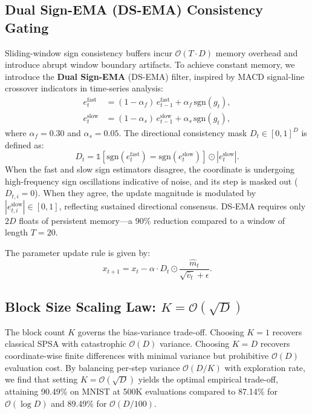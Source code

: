 \documentclass[11pt,a4paper]{article}
\begin{document}
\subsection{Dual Sign-EMA (DS-EMA) Consistency Gating}
\label{sec:ds_ema}

Sliding-window sign consistency buffers incur $\mathcal{O}(T \cdot D)$ memory overhead and introduce abrupt window boundary artifacts. To achieve constant memory, we introduce the \textbf{Dual Sign-EMA} (DS-EMA) filter, inspired by MACD signal-line crossover indicators in time-series analysis:
\begin{align}
    e_t^{\text{fast}} &= (1 - \alpha_f) \, e_{t-1}^{\text{fast}} + \alpha_f \, \text{sgn}(g_t), \label{eq:ema_fast} \\
    e_t^{\text{slow}} &= (1 - \alpha_s) \, e_{t-1}^{\text{slow}} + \alpha_s \, \text{sgn}(g_t), \label{eq:ema_slow}
\end{align}
where $\alpha_f = 0.30$ and $\alpha_s = 0.05$. The directional consistency mask $D_t \in [0, 1]^D$ is defined as:
\begin{equation}
    D_t = \mathbb{1}[\text{sgn}(e_t^{\text{fast}}) = \text{sgn}(e_t^{\text{slow}})] \odot |e_t^{\text{slow}}|.
    \label{eq:ds_ema}
\end{equation}
When the fast and slow sign estimators disagree, the coordinate is undergoing high-frequency sign oscillations indicative of noise, and its step is masked out ($D_{t,i} = 0$). When they agree, the update magnitude is modulated by $|e_{t,i}^{\text{slow}}| \in [0, 1]$, reflecting sustained directional consensus. DS-EMA requires only $2D$ floats of persistent memory---a 90\% reduction compared to a window of length $T=20$.

The parameter update rule is given by:
\begin{equation}
    x_{t+1} = x_t - \alpha \cdot D_t \odot \frac{\hat{m}_t}{\sqrt{\hat{v}_t} + \epsilon}.
    \label{eq:update}
\end{equation}

\subsection{Block Size Scaling Law: \texorpdfstring{$K = \mathcal{O}(\sqrt{D})$}{K = O(sqrt(D))}}
\label{sec:k_scaling}

The block count $K$ governs the bias-variance trade-off. Choosing $K=1$ recovers classical SPSA with catastrophic $\mathcal{O}(D)$ variance. Choosing $K=D$ recovers coordinate-wise finite differences with minimal variance but prohibitive $\mathcal{O}(D)$ evaluation cost. By balancing per-step variance $\mathcal{O}(D/K)$ with exploration rate, we find that setting $K = \mathcal{O}(\sqrt{D})$ yields the optimal empirical trade-off, attaining 90.49\% on MNIST at 500K evaluations compared to 87.14\% for $\mathcal{O}(\log D)$ and 89.49\% for $\mathcal{O}(D/100)$.
\end{document}
